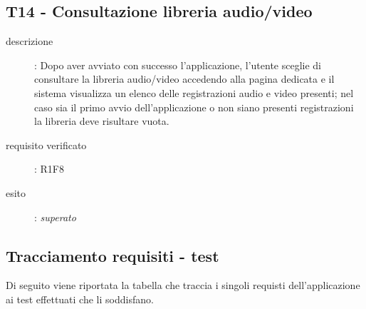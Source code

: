 \subsection{T14 - Consultazione libreria audio/video}
\begin{description}
\item[descrizione]: Dopo aver avviato con successo l'applicazione, l'utente sceglie di consultare la libreria audio/video accedendo alla pagina dedicata e il sistema visualizza un elenco delle registrazioni audio e video presenti; nel caso sia il primo avvio dell'applicazione o non siano presenti registrazioni la libreria deve risultare vuota.
\item[requisito verificato]: R1F8
\item[esito]: \emph{superato}
\end{description}

\subsection{Tracciamento requisiti - test}
Di seguito viene riportata la tabella che traccia i singoli requisti dell'applicazione ai test effettuati che li soddisfano.
